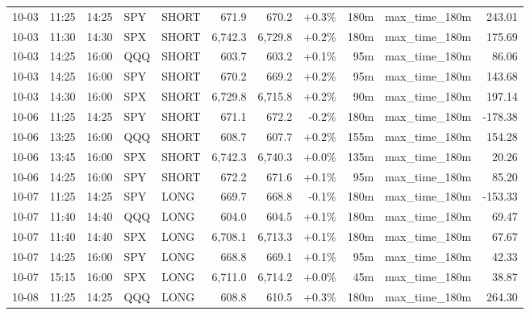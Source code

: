 \documentclass[11pt,a4paper,twoside]{article}
\begin{document}
\begin{center}
\begin{longtable}{>{\color{txtmain}}l l l l l r r r r >{\color{txtmain}}l r}
10-03 & 11:25 & 14:25 & SPY & SHORT & 671.9 & 670.2 & \textcolor{wingreen}{+0.3\%} & 180m & max\_time\_180m & \textcolor{wingreen}{243.01} \\
10-03 & 11:30 & 14:30 & SPX & SHORT & 6,742.3 & 6,729.8 & \textcolor{wingreen}{+0.2\%} & 180m & max\_time\_180m & \textcolor{wingreen}{175.69} \\
10-03 & 14:25 & 16:00 & QQQ & SHORT & 603.7 & 603.2 & \textcolor{wingreen}{+0.1\%} & 95m & max\_time\_180m & \textcolor{wingreen}{86.06} \\
10-03 & 14:25 & 16:00 & SPY & SHORT & 670.2 & 669.2 & \textcolor{wingreen}{+0.2\%} & 95m & max\_time\_180m & \textcolor{wingreen}{143.68} \\
10-03 & 14:30 & 16:00 & SPX & SHORT & 6,729.8 & 6,715.8 & \textcolor{wingreen}{+0.2\%} & 90m & max\_time\_180m & \textcolor{wingreen}{197.14} \\
10-06 & 11:25 & 14:25 & SPY & SHORT & 671.1 & 672.2 & \textcolor{lossred}{-0.2\%} & 180m & max\_time\_180m & \textcolor{lossred}{-178.38} \\
10-06 & 13:25 & 16:00 & QQQ & SHORT & 608.7 & 607.7 & \textcolor{wingreen}{+0.2\%} & 155m & max\_time\_180m & \textcolor{wingreen}{154.28} \\
10-06 & 13:45 & 16:00 & SPX & SHORT & 6,742.3 & 6,740.3 & \textcolor{wingreen}{+0.0\%} & 135m & max\_time\_180m & \textcolor{wingreen}{20.26} \\
10-06 & 14:25 & 16:00 & SPY & SHORT & 672.2 & 671.6 & \textcolor{wingreen}{+0.1\%} & 95m & max\_time\_180m & \textcolor{wingreen}{85.20} \\
10-07 & 11:25 & 14:25 & SPY & LONG & 669.7 & 668.8 & \textcolor{lossred}{-0.1\%} & 180m & max\_time\_180m & \textcolor{lossred}{-153.33} \\
10-07 & 11:40 & 14:40 & QQQ & LONG & 604.0 & 604.5 & \textcolor{wingreen}{+0.1\%} & 180m & max\_time\_180m & \textcolor{wingreen}{69.47} \\
10-07 & 11:40 & 14:40 & SPX & LONG & 6,708.1 & 6,713.3 & \textcolor{wingreen}{+0.1\%} & 180m & max\_time\_180m & \textcolor{wingreen}{67.67} \\
10-07 & 14:25 & 16:00 & SPY & LONG & 668.8 & 669.1 & \textcolor{wingreen}{+0.1\%} & 95m & max\_time\_180m & \textcolor{wingreen}{42.33} \\
10-07 & 15:15 & 16:00 & SPX & LONG & 6,711.0 & 6,714.2 & \textcolor{wingreen}{+0.0\%} & 45m & max\_time\_180m & \textcolor{wingreen}{38.87} \\
10-08 & 11:25 & 14:25 & QQQ & LONG & 608.8 & 610.5 & \textcolor{wingreen}{+0.3\%} & 180m & max\_time\_180m & \textcolor{wingreen}{264.30} \\

\end{longtable}
\end{center}
\end{document}

